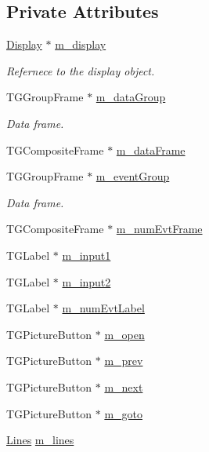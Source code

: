 \subsection*{Private Attributes}
\begin{DoxyCompactItemize}
\item 
\hyperlink{class_d_d4hep_1_1_display}{Display} $\ast$ \hyperlink{class_d_d4hep_1_1_event_control_ad9786c7cb28b2c715ba6343a2c62362a}{m\_\-display}
\begin{DoxyCompactList}\small\item\em Refernece to the display object. \item\end{DoxyCompactList}\item 
TGGroupFrame $\ast$ \hyperlink{class_d_d4hep_1_1_event_control_af0528badfa37dba89e2d73c83f246e08}{m\_\-dataGroup}
\begin{DoxyCompactList}\small\item\em Data frame. \item\end{DoxyCompactList}\item 
TGCompositeFrame $\ast$ \hyperlink{class_d_d4hep_1_1_event_control_aee2bb0377218bcfbad0fc757ffd926cb}{m\_\-dataFrame}
\item 
TGGroupFrame $\ast$ \hyperlink{class_d_d4hep_1_1_event_control_a26358da45905074e309f36f245558a92}{m\_\-eventGroup}
\begin{DoxyCompactList}\small\item\em Data frame. \item\end{DoxyCompactList}\item 
TGCompositeFrame $\ast$ \hyperlink{class_d_d4hep_1_1_event_control_a0c4a8e3502931ab1b993054ef87942c7}{m\_\-numEvtFrame}
\item 
TGLabel $\ast$ \hyperlink{class_d_d4hep_1_1_event_control_ac057e1afd1f6e5f3490a6e2b35dc6caa}{m\_\-input1}
\item 
TGLabel $\ast$ \hyperlink{class_d_d4hep_1_1_event_control_a1d9b69907b96154bc0cca2b7619b903b}{m\_\-input2}
\item 
TGLabel $\ast$ \hyperlink{class_d_d4hep_1_1_event_control_aa88e023fadd68daabea42dad9aa4cbe6}{m\_\-numEvtLabel}
\item 
TGPictureButton $\ast$ \hyperlink{class_d_d4hep_1_1_event_control_ae2a938df9e309454c1170c23c69a4214}{m\_\-open}
\item 
TGPictureButton $\ast$ \hyperlink{class_d_d4hep_1_1_event_control_a5dc965be42f51a9499cb4fecbd269ed5}{m\_\-prev}
\item 
TGPictureButton $\ast$ \hyperlink{class_d_d4hep_1_1_event_control_a238b8108eaa10db3e1b50872795cd9a6}{m\_\-next}
\item 
TGPictureButton $\ast$ \hyperlink{class_d_d4hep_1_1_event_control_ac6976dc6f6e1356fa5e6243338f41d05}{m\_\-goto}
\item 
\hyperlink{class_d_d4hep_1_1_event_control_a662fec8b3e1e89af1cf704e41cb7df78}{Lines} \hyperlink{class_d_d4hep_1_1_event_control_a773981f8dbddb1f17a2f7801a62206bd}{m\_\-lines}
\end{DoxyCompactItemize}


